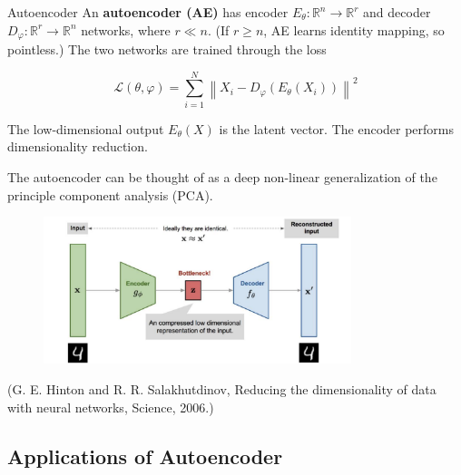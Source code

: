 \begin{frame}[allowframebreaks]

\begin{mydefinitionblock}{9.3}{Autoencoder}
    An \textbf{autoencoder (AE)} has encoder $E_{\theta}: \mathbb{R}^{n} \rightarrow \mathbb{R}^{r}$ and decoder $D_{\varphi}: \mathbb{R}^{r} \rightarrow \mathbb{R}^{n}$ networks, where $r \ll n$. (If $r \geq n$, AE learns identity mapping, so pointless.) The two networks are trained through the loss

    $$
    \mathcal{L}(\theta, \varphi)=\sum_{i=1}^{N}\left\|X_{i}-D_{\varphi}\left(E_{\theta}\left(X_{i}\right)\right)\right\|^{2}
    $$

    The low-dimensional output $E_{\theta}(X)$ is the latent vector. The encoder performs dimensionality reduction.

    The autoencoder can be thought of as a deep non-linear generalization of the principle component analysis (PCA).

    \begin{figure}[H]
        \centering
        \includegraphics[width=0.8\textwidth]{.././assets/9.1.png}
    \end{figure}

    (G. E. Hinton and R. R. Salakhutdinov, Reducing the dimensionality of data with neural networks, Science, 2006.)
\end{mydefinitionblock}

\end{frame}

\subsection{Applications of Autoencoder}

